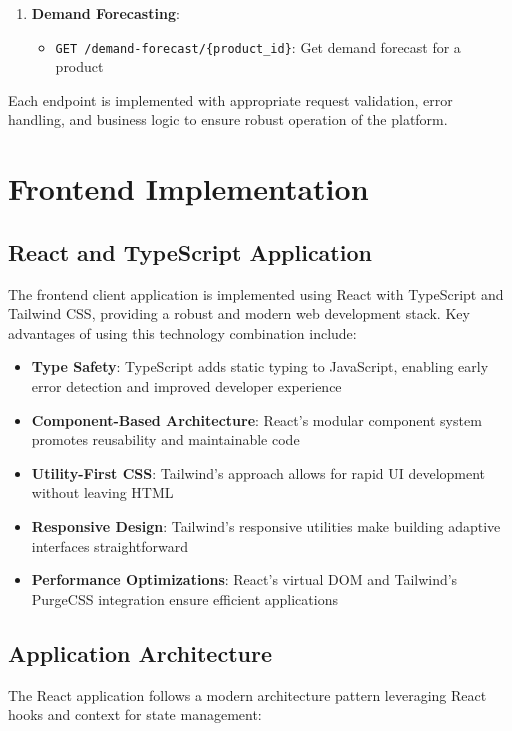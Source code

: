 \begin{enumerate}
    \item \textbf{Demand Forecasting}:
          \begin{itemize}
              \item \texttt{GET /demand-forecast/\{product\_id\}}: Get demand forecast for a product
          \end{itemize}
\end{enumerate}

Each endpoint is implemented with appropriate request validation, error handling, and business logic to ensure robust operation of the platform.

\section{Frontend Implementation}

\subsection{React and TypeScript Application}

The frontend client application is implemented using React with TypeScript and Tailwind CSS, providing a robust and modern web development stack. Key advantages of using this technology combination include:

\begin{itemize}
    \item \textbf{Type Safety}: TypeScript adds static typing to JavaScript, enabling early error detection and improved developer experience
    \item \textbf{Component-Based Architecture}: React's modular component system promotes reusability and maintainable code
    \item \textbf{Utility-First CSS}: Tailwind's approach allows for rapid UI development without leaving HTML
    \item \textbf{Responsive Design}: Tailwind's responsive utilities make building adaptive interfaces straightforward
    \item \textbf{Performance Optimizations}: React's virtual DOM and Tailwind's PurgeCSS integration ensure efficient applications
\end{itemize}

\subsection{Application Architecture}

The React application follows a modern architecture pattern leveraging React hooks and context for state management:

